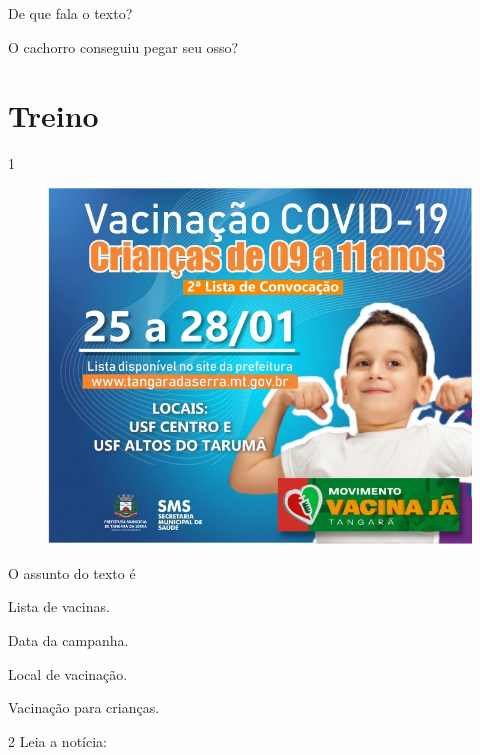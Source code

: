 \begin{escolha}
\item De que fala o texto?


\item O cachorro conseguiu pegar seu osso?

\end{escolha}

\pagebreak
\section*{Treino}

\num{1}

\begin{figure}[htpb!]
\centering
\includegraphics[width=.6\textwidth]{media/image124.jpeg}
\end{figure}


O assunto do texto é

\begin{escolha}
\item Lista de vacinas.

\item Data da campanha.

\item Local de vacinação.

\item Vacinação para crianças.
\end{escolha}

\num{2} Leia a notícia:

